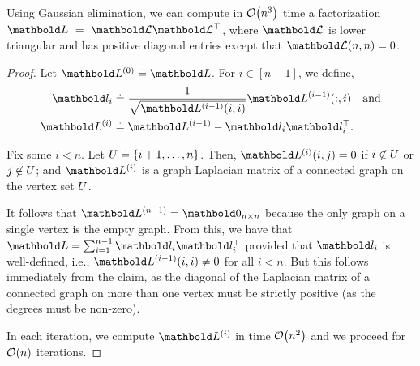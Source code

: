 \begin{thm} Using Gaussian elimination, we can compute in $\LandauO{n^3}$ time a factorization $\mL~=~\mCalL\trans{\mCalL}$, where $\mCalL$ is lower triangular and has positive diagonal entries except that $\mCalL(n,n) = 0$.
\end{thm}
\begin{proof}
Let $\mL^{(0)} \defeq \mL$. For $i \in [n-1]$, we define, \begin{align*}
    \vl_i &\defeq \frac{1}{\sqrt{\mL^{(i-1)}(i,i)}}\mL^{(i-1)}(:,i) \quad\text{and} \\
    \mL^{(i)} &\defeq \mL^{(i-1)} - \vl_i \trans{\vl_i}.
\end{align*}

\begin{clm}\label{clm:cholesky_decomp_intermediate_laplacians}
Fix some $i < n$. Let $U \overset{.}{=} \{i+1, \dots, n\}$. Then, $\mL^{(i)}(i,j) = 0$ if $i \not\in U$ or $j \not\in U$; and $\mL^{(i)}$ is a graph Laplacian matrix of a connected graph on the vertex set $U$.
\end{clm}

It follows that $\mL^{(n-1)} = \mZero_{n \times n}$ because the only graph on a single vertex is the empty graph. From this, we have that $\mL = \sum_{i=1}^{n-1} \vl_i \trans{\vl_i}$ provided that $\vl_i$ is well-defined, i.e., $\mL^{(i-1)}(i,i) \neq 0$ for all $i < n$. But this follows immediately from the claim, as the diagonal of the Laplacian matrix of a connected graph on more than one vertex must be strictly positive (as the degrees must be non-zero).

In each iteration, we compute $\mL^{(i)}$ in time $\LandauO{n^2}$ and we proceed for $\LandauO{n}$ iterations.
\end{proof}

